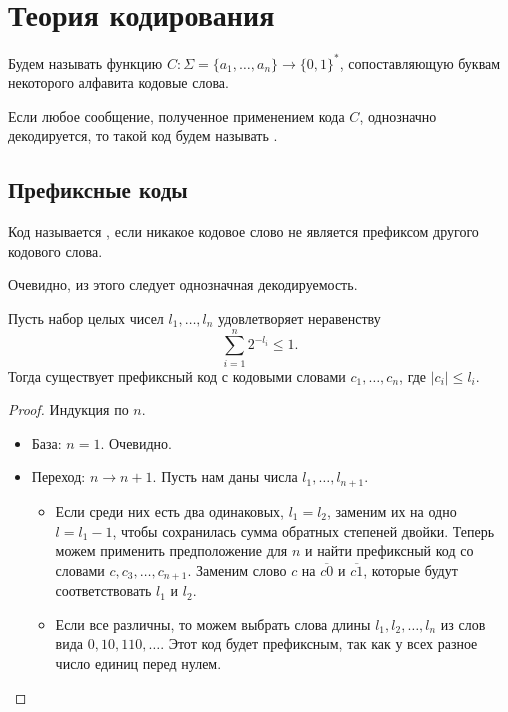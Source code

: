 \chapter{Теория кодирования}
\begin{defn}[Код]
	Будем называть  функцию $ C \colon \Sigma = \{a_1, \ldots , a_n\} \to \{0, 1\}^{*}$, сопоставляющую буквам некоторого алфавита кодовые слова.

	Если любое сообщение, полученное применением кода $ C$, однозначно декодируется, то такой код будем называть .
\end{defn}

\section{Префиксные коды}
\begin{defn}[]
	Код называется , если никакое кодовое слово не является префиксом другого кодового слова. 
\end{defn}
\begin{note}
    Очевидно, из этого следует однозначная декодируемость.
\end{note}

\begin{thm}\label{thm:exists_code}
    Пусть набор целых чисел $  l_1, \ldots , l_n$ удовлетворяет неравенству
	\[
	\sum_{i=1}^{n} 2^{-l_i} \le 1
	.\] 
	Тогда существует префиксный код с кодовыми словами $  c_1, \ldots , c_n$, где $ \lvert c_i \rvert  \le l_i$.
\end{thm}
\begin{proof}
    Индукция по $ n$.
	\begin{itemize}
		\item База: $ n = 1$. Очевидно.
		\item Переход: $ n \to  n+1$. Пусть нам даны числа $  l_1, \ldots , l_{n+1}$.

			\begin{itemize}
				\item Если среди них есть два одинаковых, $  l_1 = l_2$, заменим их на одно $ l = l_1 - 1$, чтобы сохранилась сумма обратных степеней двойки. Теперь можем применить предположение для $ n$ и найти префиксный код со словами $c, c_3, \ldots , c_{n+1}$. Заменим слово $ c$ на $ \overline{c0}$ и $\overline{c1}$, которые будут соответствовать $  l_1$ и $  l_2$. 
				\item Если все различны, то можем выбрать слова длины $  l_1, l_2, \ldots , l_n$ из слов вида $ 0, 10, 110, \ldots $. Этот код будет префиксным, так как у всех разное число единиц перед нулем.
			\end{itemize}
	\end{itemize}
\end{proof}

